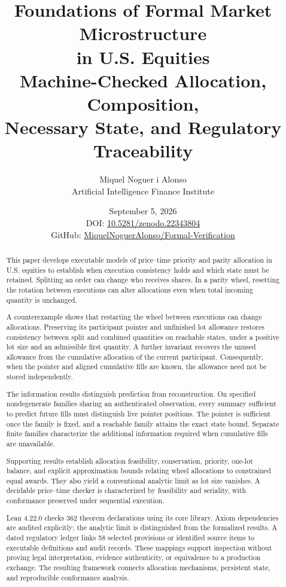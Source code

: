 \documentclass[11pt]{article}
\title{Foundations of Formal Market Microstructure\\
\Large in U.S. Equities\\[4pt]
\large Machine-Checked Allocation, Composition,\\ Necessary State, and Regulatory Traceability}
\author{Miquel Noguer i Alonso\\ Artificial Intelligence Finance Institute}
\date{September 5, 2026\\[4pt]
\small DOI: \href{https://doi.org/10.5281/zenodo.22343804}{10.5281/zenodo.22343804}\\[4pt]
\small GitHub: \href{https://github.com/MiquelNoguerAlonso/Formal-Verification}{MiquelNoguerAlonso/Formal-Verification}}
\theoremstyle{definition}
\theoremstyle{remark}
\begin{document}
\maketitle

\begin{abstract}
This paper develops executable models of price--time priority and parity allocation in U.S. equities to establish when execution consistency holds and which state must be retained. Splitting an order can change who receives shares. In a parity wheel, resetting the rotation between executions can alter allocations even when total incoming quantity is unchanged.

A counterexample shows that restarting the wheel between executions can change allocations. Preserving its participant pointer and unfinished lot allowance restores consistency between split and combined quantities on reachable states, under a positive lot size and an admissible first quantity. A further invariant recovers the unused allowance from the cumulative allocation of the current participant. Consequently, when the pointer and aligned cumulative fills are known, the allowance need not be stored independently.

The information results distinguish prediction from reconstruction. On specified nondegenerate families sharing an authenticated observation, every summary sufficient to predict future fills must distinguish live pointer positions. The pointer is sufficient once the family is fixed, and a reachable family attains the exact state bound. Separate finite families characterize the additional information required when cumulative fills are unavailable.

Supporting results establish allocation feasibility, conservation, priority, one-lot balance, and explicit approximation bounds relating wheel allocations to constrained equal awards. They also yield a conventional analytic limit as lot size vanishes. A decidable price--time checker is characterized by feasibility and seriality, with conformance preserved under sequential execution.

Lean 4.22.0 checks 362 theorem declarations using its core library. Axiom dependencies are audited explicitly; the analytic limit is distinguished from the formalized results. A dated regulatory ledger links 58 selected provisions or identified source items to executable definitions and audit records. These mappings support inspection without proving legal interpretation, evidence authenticity, or equivalence to a production exchange. The resulting framework connects allocation mechanisms, persistent state, and reproducible conformance analysis.
\end{abstract}
\end{document}
